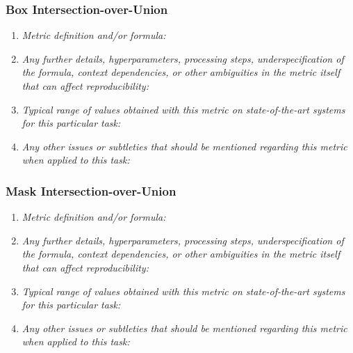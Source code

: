 \documentclass[a4paper,11pt]{article}
\begin{document}
    \subsubsection{Box Intersection-over-Union}
        \begin{enumerate}[label=\alph*.]
            \item \textit{Metric definition and/or formula:}
            \bigskip
            \item \textit{Any further details, hyperparameters, processing steps, underspecification of the formula, context dependencies, or other ambiguities in the metric itself that can affect reproducibility:}
            \bigskip
            \item \textit{Typical range of values obtained with this metric on state-of-the-art systems for this particular task:}
            \bigskip
            \item \textit{Any other issues or subtleties that should be mentioned regarding this metric when applied to this task:}
            \bigskip
        \end{enumerate}

    \subsubsection{Mask Intersection-over-Union}
        \begin{enumerate}[label=\alph*.]
            \item \textit{Metric definition and/or formula:}
            \bigskip
            \item \textit{Any further details, hyperparameters, processing steps, underspecification of the formula, context dependencies, or other ambiguities in the metric itself that can affect reproducibility:}
            \bigskip
            \item \textit{Typical range of values obtained with this metric on state-of-the-art systems for this particular task:}
            \bigskip
            \item \textit{Any other issues or subtleties that should be mentioned regarding this metric when applied to this task:}
            \bigskip
        \end{enumerate}
    
\end{document}
